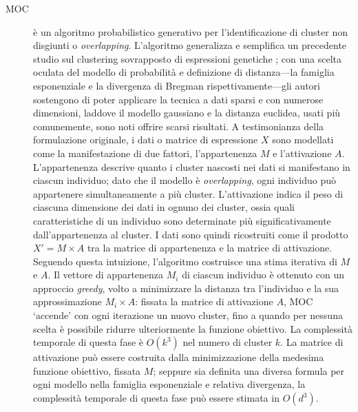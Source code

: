 \begin{description}
\item[MOC] \`e un algoritmo probabilistico generativo per l'identificazione di cluster non disgiunti o \textit{overlapping}. L'algoritmo generalizza e semplifica un precedente studio sul clustering sovrapposto di espressioni genetiche \cite{SegalBK03}; con una scelta oculata del modello di probabilit\`a e definizione di distanza---la famiglia esponenziale e la divergenza di Bregman rispettivamente---gli autori sostengono di poter applicare la tecnica a dati sparsi e con numerose dimensioni, laddove il modello gaussiano e la distanza euclidea, usati pi\`u comunemente, sono noti offrire scarsi risultati. A testimonianza della formulazione originale, i dati o matrice di espressione $X$ sono modellati come la manifestazione di due fattori, l'appartenenza $M$ e l'attivazione $A$. L'appartenenza descrive quanto i cluster nascosti nei dati si manifestano in ciascun individuo; dato che il modello \`e \textit{overlapping}, ogni individuo pu\`o appartenere simultaneamente a pi\`u cluster. L'attivazione indica il peso di ciascuna dimensione dei dati in ognuno dei cluster, ossia quali caratteristiche di un individuo sono determinate pi\`u significativamente dall'appartenenza al cluster. I dati sono quindi ricostruiti come il prodotto $X'=M \times A$ tra la matrice di appartenenza e la matrice di attivazione. Seguendo questa intuizione, l'algoritmo costruisce una stima iterativa di $M$ e $A$. Il vettore di appartenenza $M_i$ di ciascun individuo \`e ottenuto con un approccio \textit{greedy}, volto a minimizzare la distanza tra l'individuo e la sua approssimazione $M_i \times A$: fissata la matrice di attivazione $A$, MOC `accende' con ogni iterazione un nuovo cluster, fino a quando per nessuna scelta \`e possibile ridurre ulteriormente la funzione obiettivo. La complessit\`a temporale di questa fase \`e $O(k^3)$ nel numero di cluster $k$. La matrice di attivazione pu\`o essere costruita dalla minimizzazione della medesima funzione obiettivo, fissata $M$; seppure sia definita una diversa formula per ogni modello nella famiglia esponenziale e relativa divergenza, la complessit\`a temporale di questa fase pu\`o essere stimata in $O(d^3)$.

\end{description}
